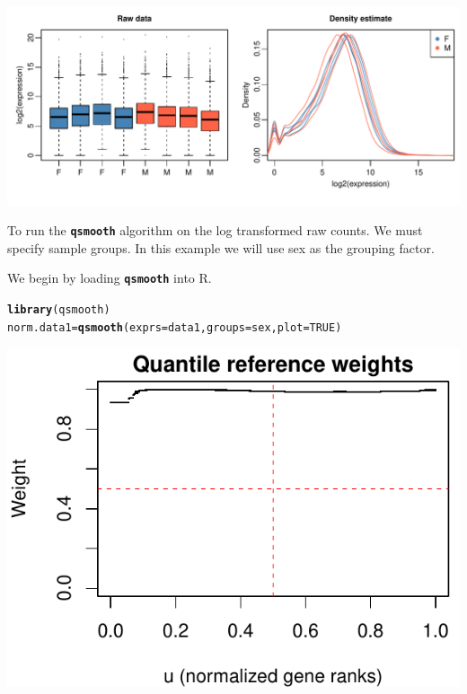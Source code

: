 \documentclass{article}\usepackage[]{graphicx}\usepackage[usenames,dvipsnames]{color}
\makeatletter
\def\maxwidth{ %
  \ifdim\Gin@nat@width>\linewidth
    \linewidth
  \else
    \Gin@nat@width
  \fi
}
\newcommand{\hlnum}[1]{\textcolor[rgb]{0.686,0.059,0.569}{#1}}%
\newcommand{\hlstd}[1]{\textcolor[rgb]{0.345,0.345,0.345}{#1}}%
\newcommand{\hlkwb}[1]{\textcolor[rgb]{0.69,0.353,0.396}{#1}}%
\newcommand{\hlkwc}[1]{\textcolor[rgb]{0.333,0.667,0.333}{#1}}%
\newcommand{\hlkwd}[1]{\textcolor[rgb]{0.737,0.353,0.396}{\textbf{#1}}}%
\newenvironment{kframe}{%
 \def\at@end@of@kframe{}%
 \ifinner\ifhmode%
  \def\at@end@of@kframe{\end{minipage}}%
  \begin{minipage}{\columnwidth}%
 \fi\fi%
 \def\FrameCommand##1{\hskip\@totalleftmargin \hskip-\fboxsep
 \colorbox{shadecolor}{##1}\hskip-\fboxsep
     \hskip-\linewidth \hskip-\@totalleftmargin \hskip\columnwidth}%
 \MakeFramed {\advance\hsize-\width
   \@totalleftmargin\z@ \linewidth\hsize
   \@setminipage}}%
 {\par\unskip\endMakeFramed%
 \at@end@of@kframe}
\newenvironment{knitrout}{}{} %
\makeatother
\begin{document}
\begin{knitrout}
\color{fgcolor}

{\centering \includegraphics[width=\maxwidth]{figure/raw1-1} 

}



\end{knitrout}

To run the \texttt{\bf{qsmooth}} algorithm on the log transformed raw counts.
We must specify sample groups. 
In this example we will use sex as the grouping factor.

We begin by loading \texttt{\bf{qsmooth}} into R. 

\begin{knitrout}
\color{fgcolor}\begin{kframe}
\begin{alltt}
\hlkwd{library}\hlstd{(qsmooth)}
\hlstd{norm.data1} \hlkwb{=} \hlkwd{qsmooth}\hlstd{(}\hlkwc{exprs}\hlstd{=data1,} \hlkwc{groups}\hlstd{=sex,} \hlkwc{plot}\hlstd{=}\hlnum{TRUE}\hlstd{)}
\end{alltt}
\end{kframe}

{\centering \includegraphics[width=\maxwidth]{figure/qsmooth1-1} 

}



\end{knitrout}
\end{document}
